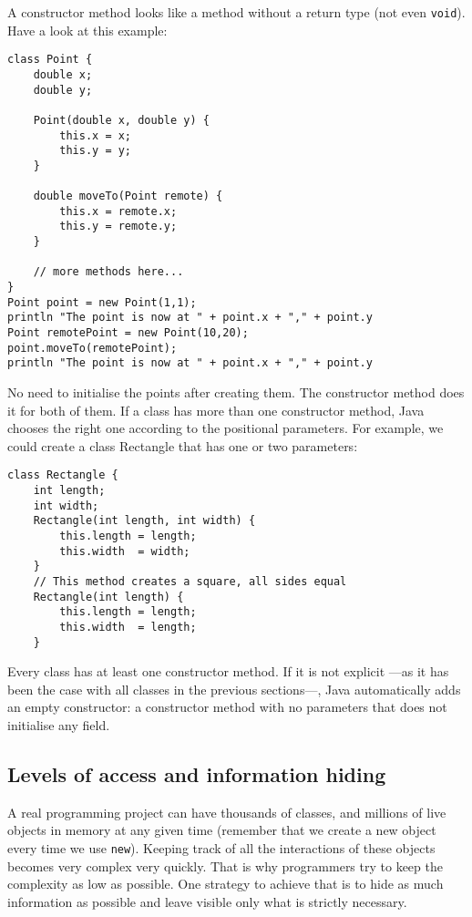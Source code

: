 A constructor method looks like a method without a return type (not
even \verb+void+). Have a look at this example:

\begin{verbatim}
class Point {
    double x;
    double y;
    
    Point(double x, double y) {
        this.x = x;
        this.y = y;
    }
    
    double moveTo(Point remote) {
        this.x = remote.x;
        this.y = remote.y;
    }
    
    // more methods here...
}
Point point = new Point(1,1);
println "The point is now at " + point.x + "," + point.y
Point remotePoint = new Point(10,20);
point.moveTo(remotePoint);
println "The point is now at " + point.x + "," + point.y
\end{verbatim}

No need to initialise the points after creating them. The constructor
method does it for both of them. 
If a class has more than one constructor method, Java chooses the
right one according to the positional parameters. For example, we
could create a class Rectangle that has one or two parameters:

\begin{verbatim}
class Rectangle {
    int length;
    int width;
    Rectangle(int length, int width) {
        this.length = length;
        this.width  = width;
    }
    // This method creates a square, all sides equal
    Rectangle(int length) {
        this.length = length;
        this.width  = length;
    }
\end{verbatim}

Every class has at
least one constructor method. If it is not explicit ---as it has been
the case with all classes in the previous sections---, Java 
automatically adds an empty
constructor: a constructor method with no parameters that does not
initialise any field. 


\subsection{Levels of access and information hiding}
\label{sec:levels-access-inform}

A real programming project can have thousands of classes, and millions
of live objects in memory at any given time (remember that we create a
new object every time we use \verb+new+). Keeping track of all the
interactions of these objects becomes very complex very quickly. That
is why programmers try to keep the complexity as low as possible. One
strategy to achieve that is to hide as much information as possible
and leave visible only what is strictly necessary. 

